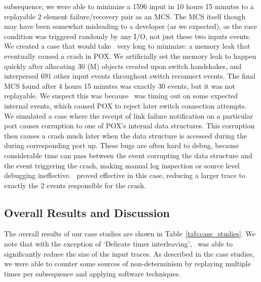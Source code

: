 subsequence, we were able to minimize a 1596 input in 10 hours 15 minutes to a
replayable 2 element failure/recovery pair as an MCS.
The MCS itself though may have been somewhat misleading to a developer (as
we expected), as the race condition
was triggered randomly by any I/O, not just these two
inputs events.\\[0.5ex]
%
We created a case that would take \projectname~very long to minimize: a
memory leak that eventually caused a crash in POX. We artificially set the
memory leak to happen quickly after allocating 30 (M) objects created upon switch
handshakes, and interpersed 691 other input events throughout switch reconnect
events. The final MCS found after 4 hours 15 minutes was exactly 30 events, but it
was not replayable. We suspect this was because \projectname~was timing out on
some expected internal events, which caused POX to reject later switch
connection attempts.\\[0.5ex]
%
We simulated a case where the receipt of
link failure notification on a particular port causes corruption to one of
POX's internal data
structures. This corruption then causes a crash much later when the data structure is
accessed during the during corresponding port up. These bugs
are often hard to debug, because considerable time can pass between the event
corrupting the data structure and the event triggering the crash, making
manual log inspection or source level debugging ineffective.
\projectname~proved effective in this case, reducing a larger trace to
exactly the 2 events responsible for the crash.

\subsection{Overall Results and Discussion}

The overall results of our case studies are shown in
Table~\ref{tab:case_studies}. We note that with the exception of `Delicate timer
interleaving', \projectname~was able to significantly reduce the size of the
input traces. As described in the case studies, we were able to
counter some sources of non-determinism
by replaying multiple times per subsequence and applying software techniques.


